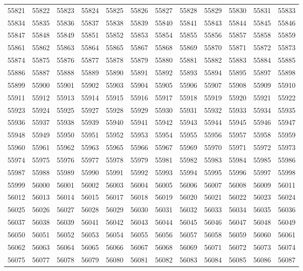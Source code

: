 \begin{center}
\begin{longtable}{llllllllllll}
55821 &55822 &55823 &55824 &55825 &55826 &55827 &55828 &55829 &55830 &55831 &55833 \\
55834 &55835 &55836 &55837 &55838 &55839 &55840 &55841 &55843 &55844 &55845 &55846 \\
55847 &55848 &55849 &55851 &55852 &55853 &55854 &55855 &55856 &55857 &55858 &55859 \\
55861 &55862 &55863 &55864 &55865 &55867 &55868 &55869 &55870 &55871 &55872 &55873 \\
55874 &55875 &55876 &55877 &55878 &55879 &55880 &55881 &55882 &55883 &55884 &55885 \\
55886 &55887 &55888 &55889 &55890 &55891 &55892 &55893 &55894 &55895 &55897 &55898 \\
55899 &55900 &55901 &55902 &55903 &55904 &55905 &55906 &55907 &55908 &55909 &55910 \\
55911 &55912 &55913 &55914 &55915 &55916 &55917 &55918 &55919 &55920 &55921 &55922 \\
55923 &55924 &55925 &55927 &55928 &55929 &55930 &55931 &55932 &55933 &55934 &55935 \\
55936 &55937 &55938 &55939 &55940 &55941 &55942 &55943 &55944 &55945 &55946 &55947 \\
55948 &55949 &55950 &55951 &55952 &55953 &55954 &55955 &55956 &55957 &55958 &55959 \\
55960 &55961 &55962 &55963 &55965 &55966 &55967 &55969 &55970 &55971 &55972 &55973 \\
55974 &55975 &55976 &55977 &55978 &55979 &55981 &55982 &55983 &55984 &55985 &55986 \\
55987 &55988 &55989 &55990 &55991 &55992 &55993 &55994 &55995 &55996 &55997 &55998 \\
55999 &56000 &56001 &56002 &56003 &56004 &56005 &56006 &56007 &56008 &56009 &56011 \\
56012 &56013 &56014 &56015 &56017 &56018 &56019 &56020 &56021 &56022 &56023 &56024 \\
56025 &56026 &56027 &56028 &56029 &56030 &56031 &56032 &56033 &56034 &56035 &56036 \\
56037 &56038 &56039 &56041 &56042 &56043 &56044 &56045 &56046 &56047 &56048 &56049 \\
56050 &56051 &56052 &56053 &56054 &56055 &56056 &56057 &56058 &56059 &56060 &56061 \\
56062 &56063 &56064 &56065 &56066 &56067 &56068 &56069 &56071 &56072 &56073 &56074 \\
56075 &56077 &56078 &56079 &56080 &56081 &56082 &56083 &56084 &56085 &56086 &56087 \\

\end{longtable}
\end{center}
